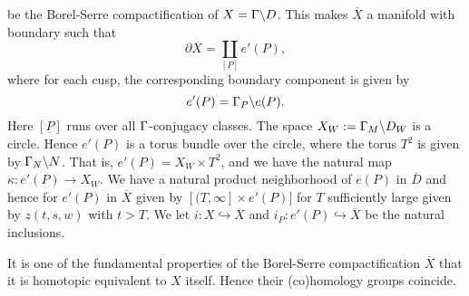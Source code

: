 be the Borel-Serre compactification of $X = \Gamma \backslash D$. This makes
$\overline{X}$ a manifold with boundary such that
\[
\partial \overline{X} = \coprod_{[\underline{P}]} e'({P}),
\]
where for each cusp, the corresponding boundary component is given by
\[
e'(P) = \Gamma_P \backslash e(P).
\]
Here $[\underline{P}]$ runs over all $\Gamma$-conjugacy classes. The
space $X_W := \Gamma_M \backslash D_W$ is a circle. Hence $e'(P)$ is a torus
bundle over the circle, where the torus $T^2$ is given by $\Gamma_N
\backslash N$. That is, $
e'(P) = X_W \times T^2$, and we have the natural map $\kappa: e'(P) \to X_W$. We have a natural product neighborhood of $e(P)$ in $\overline{D}$ and hence for $e'(P)$ in $\overline{X}$ given by $[(T,\infty] \times e'(P)]$ for $T$ sufficiently large given by $z(t,s,w)$ with $t>T$. We let $i: X \hookrightarrow \overline{X}$ and $i_P: e'(P)\hookrightarrow \overline{X} $ be the natural inclusions.

It is one of the fundamental properties of the Borel-Serre
compactification $\overline{X}$ that it is homotopic equivalent to
$X$ itself. Hence their (co)homology groups coincide.

